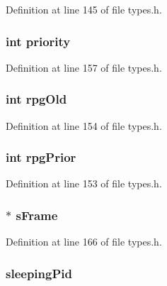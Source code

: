 Definition at line 145 of file types.h.

\hypertarget{structprocess__t_acec9ce2df15222151ad66fcb1d74eb9f}{
\subsubsection[{priority}]{\setlength{\rightskip}{0pt plus 5cm}int {\bf priority}}}
\label{structprocess__t_acec9ce2df15222151ad66fcb1d74eb9f}


Definition at line 157 of file types.h.

\hypertarget{structprocess__t_aa92db4fb120da36d4d5f60e2a8e01ce0}{
\subsubsection[{rpgOld}]{\setlength{\rightskip}{0pt plus 5cm}int {\bf rpgOld}}}
\label{structprocess__t_aa92db4fb120da36d4d5f60e2a8e01ce0}


Definition at line 154 of file types.h.

\hypertarget{structprocess__t_a3069d63842ac168171e4c2a659ac06d5}{
\subsubsection[{rpgPrior}]{\setlength{\rightskip}{0pt plus 5cm}int {\bf rpgPrior}}}
\label{structprocess__t_a3069d63842ac168171e4c2a659ac06d5}


Definition at line 153 of file types.h.

\hypertarget{structprocess__t_a835da90e3143feb2586b1d88a186a32c}{
\subsubsection[{sFrame}]{$\ast$ {\bf sFrame}}}
\label{structprocess__t_a835da90e3143feb2586b1d88a186a32c}


Definition at line 166 of file types.h.

\hypertarget{structprocess__t_a51c991682921a9f2a4de5cf819c29f17}{
\subsubsection[{sleepingPid}]{ {\bf sleepingPid}}}
\label{structprocess__t_a51c991682921a9f2a4de5cf819c29f17}


